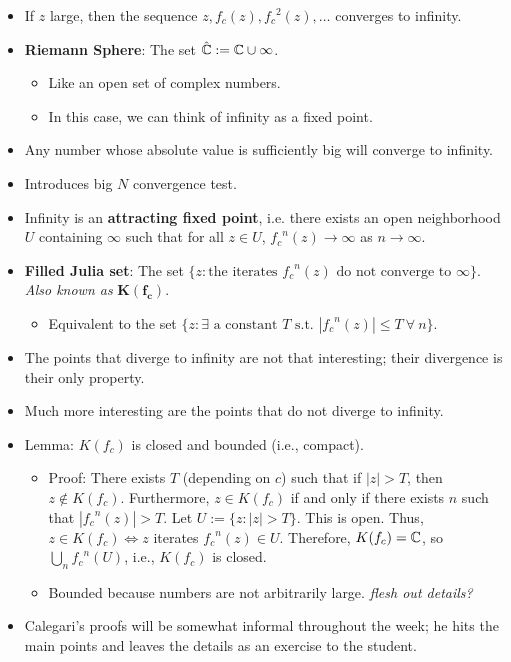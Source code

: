 \documentclass[../apprentice.tex]{subfiles}
\begin{document}
\begin{itemize}
    \item If $z$ large, then the sequence $z,f_c(z),{f_c}^2(z),\dots$ converges to infinity.
    \item \textbf{Riemann Sphere}: The set $\hat{\mathbb{C}}:=\mathbb{C}\cup\infty$.
    \begin{itemize}
        \item Like an open set of complex numbers.
        \item In this case, we can think of infinity as a fixed point.
    \end{itemize}
    \item Any number whose absolute value is sufficiently big will converge to infinity.
    \item Introduces big $N$ convergence test.
    \item Infinity is an \textbf{attracting fixed point}, i.e. there exists an open neighborhood $U$ containing $\infty$ such that for all $z\in U$, ${f_c}^n(z)\to\infty$ as $n\to\infty$.
    \item \textbf{Filled Julia set}: The set $\{z:\text{the iterates }{f_c}^n(z)\text{ do not converge to }\infty\}$. \emph{Also known as} $\bm{K(f_c)}$.
    \begin{itemize}
        \item Equivalent to the set $\{z:\exists\text{ a constant }T\text{ s.t. }|{f_c}^n(z)|\leq T\ \forall\ n\}$.
    \end{itemize}
    \item The points that diverge to infinity are not that interesting; their divergence is their only property.
    \item Much more interesting are the points that do not diverge to infinity.
    \item Lemma: $K(f_c)$ is closed and bounded (i.e., compact).
    \begin{itemize}
        \item Proof: There exists $T$ (depending on $c$) such that if $|z|>T$, then $z\notin K(f_c)$. Furthermore, $z\in K(f_c)$ if and only if there exists $n$ such that $|{f_c}^n(z)|>T$. Let $U:=\{z:|z|>T\}$. This is open. Thus, $z\in K(f_c)\Longleftrightarrow z$ iterates ${f_c}^n(z)\in U$. Therefore, $K(f_c)=\mathbb{C}$, so $\bigcup_n{f_c}^n(U)$, i.e., $K(f_c)$ is closed.
        \item Bounded because numbers are not arbitrarily large. \emph{flesh out details?}
    \end{itemize}
    \item Calegari's proofs will be somewhat informal throughout the week; he hits the main points and leaves the details as an exercise to the student.

\end{itemize}
\end{document}
